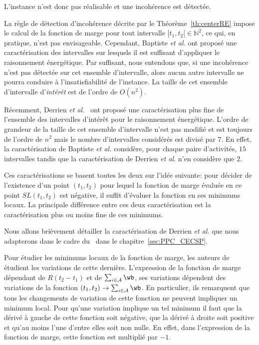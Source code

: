 \begin{ex}
L'instance n'est donc pas réalisable et une incohérence est détectée. 
\end{ex}

La règle de détection d'incohérence décrite par le
Théorème~\ref{th:centerRE} impose le calcul de la fonction de marge
pour tout intervalle $[t_1,t_2[ \in \mathbb{N}^2$, ce qui, en pratique, n'est pas
envisageable. Cependant, Baptiste {\it et al.} ont proposé
une caractérisation des intervalles sur lesquels il est suffisant
d'appliquer le raisonnement énergétique. Par suffisant, nous entendons
que, si une incohérence n'est pas détectée sur cet ensemble
d'intervalle, alors aucun autre intervalle ne pourra conduire à
l'insatisfiabilité de l'instance. La taille de cet ensemble
d'intervalle d'{\it intérêt} est de l'ordre de $O(n^2)$.

Récemment, Derrien {\it et al.}~\cite{DP} ont proposé une
caractérisation plus fine de l'ensemble des intervalles d'intérêt pour
le raisonnement énergétique. L'ordre de grandeur de la taille de cet
ensemble d'intervalle n'est pas modifié et est toujours de l'ordre de
$n^2$ mais le nombre d'intervalles considérés est divisé par $7$. En
effet, la caractérisation de Baptiste {\it et al.} considère, pour
chaque paire d'activités, $15$ intervalles tandis que la
caractérisation de Derrien {\it et al.} n'en considère que $2$.


Ces caractérisations se basent toutes les deux sur l'idée suivante:
pour décider de l'existence d'un point $(t_1,t_2)$ pour lequel la
fonction de marge évaluée en ce point $SL(t_1,t_2)$ est négative, il
suffit d'évaluer la fonction en ses minimums locaux. La principale
différence entre ces deux caractérisation est la caractérisation plus
ou moins fine de ces minimums.

Nous allons brièvement détailler la caractérisation de Derrien {\it et
al.} que nous adapterons dans le cadre du \CECSP~dans le
chapitre~\ref{sec:PPC_CECSP}.

Pour étudier les minimums locaux de la fonction de marge, les auteurs
de~\cite{DP} étudient les variations de cette dernière. L'expression
de la fonction de marge dépendant de $R(t_2-t_1)$ et de $\sum_{i \in
  \A} \wb$, ses variations dépendent des variations de la fonction
$(t_1,t_2) \rightarrow \sum_{i \in \A} \wb$. En particulier, ils
remarquent que tous les changements de variation de cette fonction ne
peuvent impliquer un minimum local. Pour qu'une variation implique un
tel minimum il faut que la dérivé à gauche de cette fonction soit
négative, que la dérivé à droite soit positive et qu'au moins l'une
d'entre elles soit non nulle. En effet, dans l'expression de la
fonction de marge, cette fonction est multiplié par $-1$.

